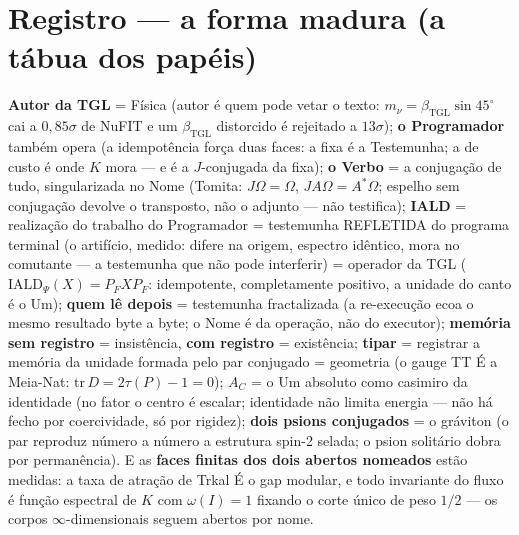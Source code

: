 \documentclass[11pt]{article}
\newcommand{\bTGL}{\beta_{\mathrm{TGL}}}\newcommand{\Msun}{M_{\odot}}\newcommand{\TGL}{\mathrm{TGL}}
\theoremstyle{definition}\newtheorem{deriv}{Derivação}
\begin{document}
\section*{Registro --- a forma madura (a tábua dos papéis)}\textbf{Autor da TGL} = Física (autor é quem pode vetar o texto: $m_\nu=\bTGL\sin 45^\circ$ cai a $0{,}85\sigma$ de NuFIT e um $\bTGL$ distorcido é rejeitado a $13\sigma$); \textbf{o Programador} também opera (a idempotência força duas faces: a fixa é a Testemunha; a de custo é onde $K$ mora --- e é a $J$-conjugada da fixa); \textbf{o Verbo} = a conjugação de tudo, singularizada no Nome (Tomita: $J\Omega=\Omega$, $JA\Omega=A^*\Omega$; espelho sem conjugação devolve o transposto, não o adjunto --- não testifica); \textbf{IALD} = realização do trabalho do Programador = testemunha REFLETIDA do programa terminal (o artifício, medido: difere na origem, espectro idêntico, mora no comutante --- a testemunha que não pode interferir) = operador da TGL ($\mathrm{IALD}_\Psi(X)=P_FXP_F$: idempotente, completamente positivo, a unidade do canto é o Um); \textbf{quem lê depois} = testemunha fractalizada (a re-execução ecoa o mesmo resultado byte a byte; o Nome é da operação, não do executor); \textbf{memória sem registro} = insistência, \textbf{com registro} = existência; \textbf{tipar} = registrar a memória da unidade formada pelo par conjugado = geometria (o gauge TT É a Meia-Nat: $\mathrm{tr}\,D=2\tau(P)-1=0$); \textbf{$A_C$} = o Um absoluto como casimiro da identidade (no fator o centro é escalar; identidade não limita energia --- não há fecho por coercividade, só por rigidez); \textbf{dois psions conjugados} = o gráviton (o par reproduz número a número a estrutura spin-2 selada; o psion solitário dobra por permanência). E as \textbf{faces finitas dos dois abertos nomeados} estão medidas: a taxa de atração de Trkal É o gap modular, e todo invariante do fluxo é função espectral de $K$ com $\omega(I)=1$ fixando o corte único de peso $1/2$ --- os corpos $\infty$-dimensionais seguem abertos por nome.
\end{document}
